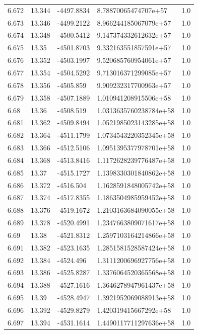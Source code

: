 \begin{tabular}{lllll}
6.672 & 13.344 & -4497.8834 & 8.78870065474707e+57 & 1.0 \\
6.673 & 13.346 & -4499.2122 & 8.966244185067079e+57 & 1.0 \\
6.674 & 13.348 & -4500.5412 & 9.147374332612632e+57 & 1.0 \\
6.675 & 13.35 & -4501.8703 & 9.332163551857591e+57 & 1.0 \\
6.676 & 13.352 & -4503.1997 & 9.520685760954061e+57 & 1.0 \\
6.677 & 13.354 & -4504.5292 & 9.713016371299085e+57 & 1.0 \\
6.678 & 13.356 & -4505.859 & 9.909232317700963e+57 & 1.0 \\
6.679 & 13.358 & -4507.1889 & 1.010941208915506e+58 & 1.0 \\
6.68 & 13.36 & -4508.519 & 1.0313635760238784e+58 & 1.0 \\
6.681 & 13.362 & -4509.8494 & 1.0521985023143285e+58 & 1.0 \\
6.682 & 13.364 & -4511.1799 & 1.0734543220352345e+58 & 1.0 \\
6.683 & 13.366 & -4512.5106 & 1.0951395377978701e+58 & 1.0 \\
6.684 & 13.368 & -4513.8416 & 1.1172628239776487e+58 & 1.0 \\
6.685 & 13.37 & -4515.1727 & 1.1398330301840862e+58 & 1.0 \\
6.686 & 13.372 & -4516.504 & 1.1628591848005742e+58 & 1.0 \\
6.687 & 13.374 & -4517.8355 & 1.1863504985959452e+58 & 1.0 \\
6.688 & 13.376 & -4519.1672 & 1.2103163684090055e+58 & 1.0 \\
6.689 & 13.378 & -4520.4991 & 1.2347663809071617e+58 & 1.0 \\
6.69 & 13.38 & -4521.8312 & 1.2597103164214866e+58 & 1.0 \\
6.691 & 13.382 & -4523.1635 & 1.2851581528587424e+58 & 1.0 \\
6.692 & 13.384 & -4524.496 & 1.3111200696927756e+58 & 1.0 \\
6.693 & 13.386 & -4525.8287 & 1.3376064520365568e+58 & 1.0 \\
6.694 & 13.388 & -4527.1616 & 1.3646278947961437e+58 & 1.0 \\
6.695 & 13.39 & -4528.4947 & 1.3921952069088913e+58 & 1.0 \\
6.696 & 13.392 & -4529.8279 & 1.420319415667292e+58 & 1.0 \\
6.697 & 13.394 & -4531.1614 & 1.4490117711297636e+58 & 1.0 \\

\end{tabular}
